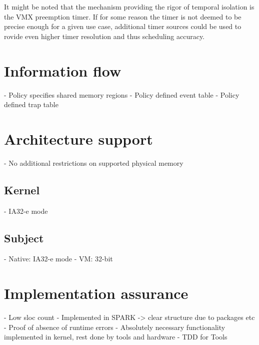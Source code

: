 It might be noted that the mechanism providing the rigor of temporal isolation
is the VMX preemption timer. If for some reason the timer is not deemed to be
precise enough for a given use case, additional timer sources could be used to
rovide even higher timer resolution and thus scheduling accuracy.

\section{Information flow}
- Policy specifies shared memory regions
- Policy defined event table
- Policy defined trap table

\section{Architecture support}
- No additional restrictions on supported physical memory

\subsection{Kernel}
- IA32-e mode

\subsection{Subject}
- Native: IA32-e mode
- VM: 32-bit

\section{Implementation assurance}
- Low sloc count
- Implemented in SPARK -> clear structure due to packages etc
- Proof of absence of runtime errors
- Absolutely necessary functionality implemented in kernel, rest done by tools
  and hardware
- TDD for Tools
